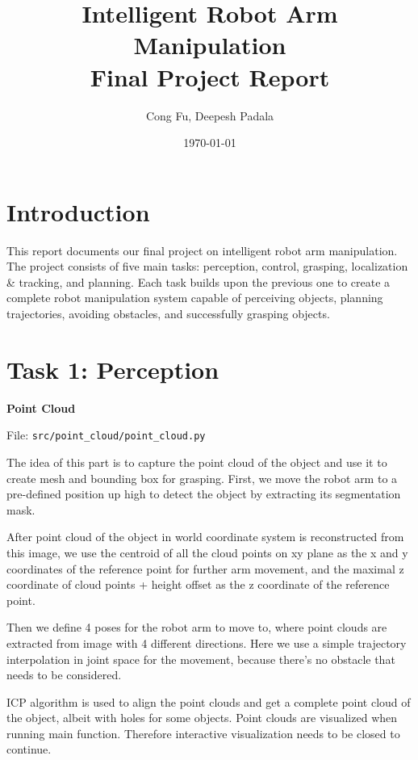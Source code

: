 \documentclass[
	english,
	accentcolor=11d,%
	type=intern,
	marginpar=false,
    logofile=media/PEARLTUDA.png
	]{tudapub}
\let\code\texttt
\begin{document}
\title{Intelligent Robot Arm Manipulation\\Final Project Report}
\author{Cong Fu, Deepesh Padala}
\date{\today} %
\maketitle
\tableofcontents

\section{Introduction}
This report documents our final project on intelligent robot arm manipulation. The project consists of five main tasks: perception, control, grasping, localization \& tracking, and planning. Each task builds upon the previous one to create a complete robot manipulation system capable of perceiving objects, planning trajectories, avoiding obstacles, and successfully grasping objects.

\section{Task 1: Perception}

\noindent\textbf{Point Cloud}

\noindent File: \code{src/point\_cloud/point\_cloud.py}

The idea of this part is to capture the point cloud of the object and use it to create mesh and bounding box for grasping. First, we move the robot arm to a pre-defined position up high to detect the object by extracting its segmentation mask. 

After point cloud of the object in world coordinate system is reconstructed from this image, we use the centroid of all the cloud points on xy plane as the x and y coordinates of the reference point for further arm movement, and the maximal z coordinate of cloud points + height offset as the z coordinate of the reference point.

Then we define 4 poses for the robot arm to move to, where point clouds are extracted from image with 4 different directions. Here we use a simple trajectory interpolation in joint space for the movement, because there's no obstacle that needs to be considered.

ICP algorithm is used to align the point clouds and get a complete point cloud of the object, albeit with holes for some objects. Point clouds are visualized when running main function. Therefore interactive visualization needs to be closed to continue.
\end{document}
